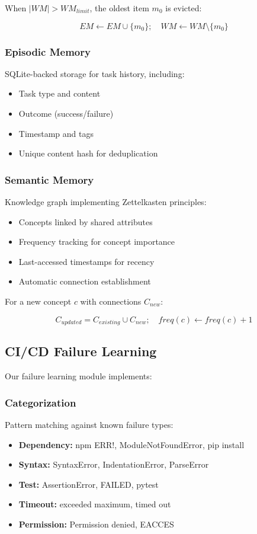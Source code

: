 \documentclass{article}
\begin{document}
When $|WM| > WM_{limit}$, the oldest item $m_0$ is evicted:

\begin{equation}
    EM \leftarrow EM \cup \{m_0\}; \quad WM \leftarrow WM \setminus \{m_0\}
\end{equation}

\subsubsection{Episodic Memory}
SQLite-backed storage for task history, including:
\begin{itemize}
    \item Task type and content
    \item Outcome (success/failure)
    \item Timestamp and tags
    \item Unique content hash for deduplication
\end{itemize}

\subsubsection{Semantic Memory}
Knowledge graph implementing Zettelkasten principles:
\begin{itemize}
    \item Concepts linked by shared attributes
    \item Frequency tracking for concept importance
    \item Last-accessed timestamps for recency
    \item Automatic connection establishment
\end{itemize}

For a new concept $c$ with connections $C_{new}$:

\begin{equation}
    C_{updated} = C_{existing} \cup C_{new}; \quad freq(c) \leftarrow freq(c) + 1
\end{equation}

\subsection{CI/CD Failure Learning}

Our failure learning module implements:

\subsubsection{Categorization}
Pattern matching against known failure types:
\begin{itemize}
    \item \textbf{Dependency:} npm ERR!, ModuleNotFoundError, pip install
    \item \textbf{Syntax:} SyntaxError, IndentationError, ParseError
    \item \textbf{Test:} AssertionError, FAILED, pytest
    \item \textbf{Timeout:} exceeded maximum, timed out
    \item \textbf{Permission:} Permission denied, EACCES
\end{itemize}
\end{document}
